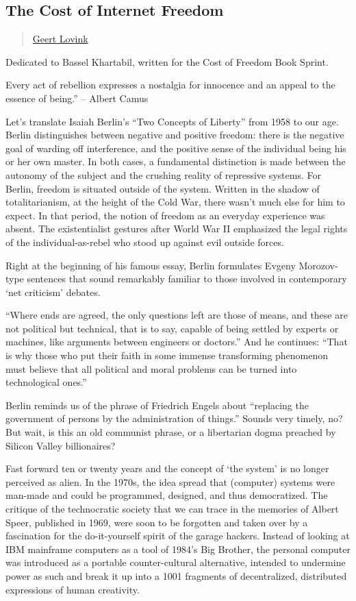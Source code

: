 \subsection{The Cost of Internet
Freedom}\label{the-cost-of-internet-freedom}

\begin{quote}
\hyperlink{geert-lovink}{Geert Lovink}
\end{quote}

Dedicated to Bassel Khartabil, written for the Cost of Freedom Book
Sprint.

Every act of rebellion expresses a nostalgia for innocence and an appeal
to the essence of being.'' -- Albert Camus

Let's translate Isaiah Berlin's ``Two Concepts of Liberty'' from 1958 to
our age. Berlin distinguishes between negative and positive freedom:
there is the negative goal of warding off interference, and the positive
sense of the individual being his or her own master. In both cases, a
fundamental distinction is made between the autonomy of the subject and
the crushing reality of repressive systems. For Berlin, freedom is
situated outside of the system. Written in the shadow of
totalitarianism, at the height of the Cold War, there wasn't much else
for him to expect. In that period, the notion of freedom as an everyday
experience was absent. The existentialist gestures after World War II
emphasized the legal rights of the individual-as-rebel who stood up
against evil outside forces.

Right at the beginning of his famous essay, Berlin formulates Evgeny
Morozov-type sentences that sound remarkably familiar to those involved
in contemporary `net criticism' debates.

``Where ends are agreed, the only questions left are those of means, and
these are not political but technical, that is to say, capable of being
settled by experts or machines, like arguments between engineers or
doctors.'' And he continues: ``That is why those who put their faith in
some immense transforming phenomenon must believe that all political and
moral problems can be turned into technological ones.''

Berlin reminds us of the phrase of Friedrich Engels about ``replacing
the government of persons by the administration of things.'' Sounds very
timely, no? But wait, is this an old communist phrase, or a libertarian
dogma preached by Silicon Valley billionaires?

Fast forward ten or twenty years and the concept of `the system' is no
longer perceived as alien. In the 1970s, the idea spread that (computer)
systems were man-made and could be programmed, designed, and thus
democratized. The critique of the technocratic society that we can trace
in the memories of Albert Speer, published in 1969, were soon to be
forgotten and taken over by a fascination for the do-it-yourself spirit
of the garage hackers. Instead of looking at IBM mainframe computers as
a tool of 1984's Big Brother, the personal computer was introduced as a
portable counter-cultural alternative, intended to undermine power as
such and break it up into a 1001 fragments of decentralized, distributed
expressions of human creativity.

